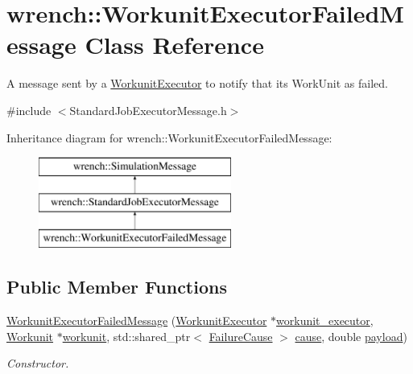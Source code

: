 \hypertarget{classwrench_1_1_workunit_executor_failed_message}{}\section{wrench\+:\+:Workunit\+Executor\+Failed\+Message Class Reference}
\label{classwrench_1_1_workunit_executor_failed_message}


A message sent by a \hyperlink{classwrench_1_1_workunit_executor}{Workunit\+Executor} to notify that its Work\+Unit as failed.  




{\ttfamily \#include $<$Standard\+Job\+Executor\+Message.\+h$>$}

Inheritance diagram for wrench\+:\+:Workunit\+Executor\+Failed\+Message\+:\begin{figure}[H]
\begin{center}
\leavevmode
\includegraphics[height=3.000000cm]{classwrench_1_1_workunit_executor_failed_message}
\end{center}
\end{figure}
\subsection*{Public Member Functions}
\begin{DoxyCompactItemize}
\item 
\hyperlink{classwrench_1_1_workunit_executor_failed_message_a217bde138e0d4910651a9d8d78c8d4b8}{Workunit\+Executor\+Failed\+Message} (\hyperlink{classwrench_1_1_workunit_executor}{Workunit\+Executor} $\ast$\hyperlink{classwrench_1_1_workunit_executor_failed_message_a5fdf3e8cc5c39106cd884313b60e35f0}{workunit\+\_\+executor}, \hyperlink{classwrench_1_1_workunit}{Workunit} $\ast$\hyperlink{classwrench_1_1_workunit_executor_failed_message_ad7edddc605eee420e1eb7771e90f4aae}{workunit}, std\+::shared\+\_\+ptr$<$ \hyperlink{classwrench_1_1_failure_cause}{Failure\+Cause} $>$ \hyperlink{classwrench_1_1_workunit_executor_failed_message_a9fa7d3a3c3e72e9b1cb714ecf885f67b}{cause}, double \hyperlink{classwrench_1_1_simulation_message_a914f2732713f7c02898e66f05a7cb8a1}{payload})
\begin{DoxyCompactList}\small\item\em Constructor. \end{DoxyCompactList}\end{DoxyCompactItemize}
